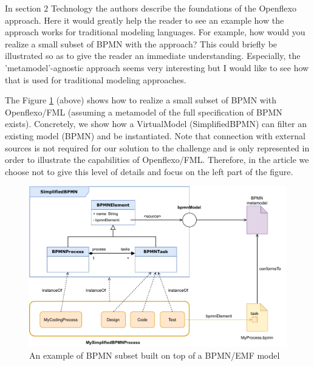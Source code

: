 \documentclass[10pt]{article}
\begin{document}
\begin{response}{In section 2 Technology the authors describe the foundations of the Openflexo approach. Here it would greatly help the reader to see an example how the approach works for traditional modeling languages. For example, how would you realize a small subset of BPMN with the approach? This could briefly be illustrated so as to give the reader an immediate understanding. Especially, the 'metamodel'-agnostic approach seems very interesting but I would like to see how that is used for traditional modeling approaches.}

The Figure \ref{fig:BPMNSubsetExample} (above) shows how to realize a small subset of BPMN with Openflexo/FML (assuming a metamodel of the full specification of BPMN exists). Concretely, we show  how a VirtualModel (SimplifiedBPMN) can filter an existing model (BPMN) and be instantiated. Note that connection with external sources is not required for our solution to the challenge and is only represented in order to illustrate the capabilities of Openflexo/FML. Therefore, in the article we choose not to give this level of details and focus on the left part of the figure.


\begin{figure}[t]
    \centering
    \includegraphics[width=1.0 \textwidth]{Figures/BPMNSubsetExampleWithExternalConnexion.pdf}
    \caption{An example of BPMN subset built on top of a BPMN/EMF model}
    \label{fig:BPMNSubsetExample}
\end{figure}


\end{response}
\end{document}
